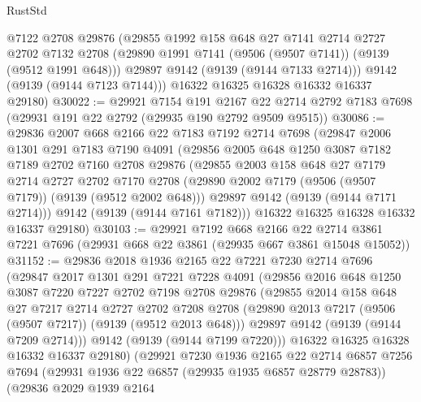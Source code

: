 \begin{lexlean}{RustStd}
\begin{coremodule}
        @7122
        @2708
        @29876
        (@29855
          @1992
          @158
          @648
          @27
          @7141
          @2714
          @2727
          @2702
          @7132
          @2708
          (@29890 @1991 @7141 (@9506 (@9507 @7141)) (@9139 (@9512 @1991 @648)))
          @29897
          @9142
          (@9139 (@9144 @7133 @2714)))
        @9142
        (@9139 (@9144 @7123 @7144)))
      @16322
      @16325
      @16328
      @16332
      @16337
      @29180)
@30022 := @29921
    @7154
    @191
    @2167
    @22
    @2714
    @2792
    @7183
    @7698
    (@29931 @191 @22 @2792 (@29935 @190 @2792 @9509 @9515))
@30086 := @29836
    @2007
    @668
    @2166
    @22
    @7183
    @7192
    @2714
    @7698
    (@29847
      @2006
      @1301
      @291
      @7183
      @7190
      @4091
      (@29856
        @2005
        @648
        @1250
        @3087
        @7182
        @7189
        @2702
        @7160
        @2708
        @29876
        (@29855
          @2003
          @158
          @648
          @27
          @7179
          @2714
          @2727
          @2702
          @7170
          @2708
          (@29890 @2002 @7179 (@9506 (@9507 @7179)) (@9139 (@9512 @2002 @648)))
          @29897
          @9142
          (@9139 (@9144 @7171 @2714)))
        @9142
        (@9139 (@9144 @7161 @7182)))
      @16322
      @16325
      @16328
      @16332
      @16337
      @29180)
@30103 := @29921
    @7192
    @668
    @2166
    @22
    @2714
    @3861
    @7221
    @7696
    (@29931 @668 @22 @3861 (@29935 @667 @3861 @15048 @15052))
@31152 := @29836
    @2018
    @1936
    @2165
    @22
    @7221
    @7230
    @2714
    @7696
    (@29847
      @2017
      @1301
      @291
      @7221
      @7228
      @4091
      (@29856
        @2016
        @648
        @1250
        @3087
        @7220
        @7227
        @2702
        @7198
        @2708
        @29876
        (@29855
          @2014
          @158
          @648
          @27
          @7217
          @2714
          @2727
          @2702
          @7208
          @2708
          (@29890 @2013 @7217 (@9506 (@9507 @7217)) (@9139 (@9512 @2013 @648)))
          @29897
          @9142
          (@9139 (@9144 @7209 @2714)))
        @9142
        (@9139 (@9144 @7199 @7220)))
      @16322
      @16325
      @16328
      @16332
      @16337
      @29180)
    (@29921
      @7230
      @1936
      @2165
      @22
      @2714
      @6857
      @7256
      @7694
      (@29931 @1936 @22 @6857 (@29935 @1935 @6857 @28779 @28783))
      (@29836
        @2029
        @1939
        @2164

\end{coremodule}
\end{lexlean}
